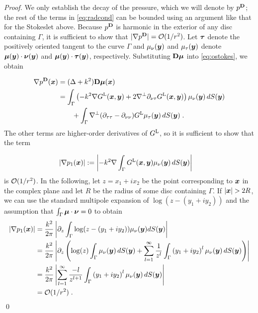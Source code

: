 \begin{proof}
We only establish the
decay of the pressure, which we will denote by $p^{\bf D}$;
the rest of the terms in \eqref{eq:radcond} can be bounded
using an argument like that for the Stokeslet above.
Because $p^{\bf D}$ is harmonic in the exterior of any disc
containing $\Gamma$, it is sufficient to show that
$|\nabla p^{\bf D}| = \mathcal{O} (1/r^2)$. Let ${\boldsymbol \tau}$ denote the
positively oriented tangent to the curve $\Gamma$ and
$\mu_\nu({\boldsymbol y})$ and $\mu_\tau({\boldsymbol y})$ denote ${\boldsymbol \mu}({\boldsymbol y}) \cdot {\boldsymbol \nu}({\boldsymbol y})$ and
${\boldsymbol \mu}({\boldsymbol y}) \cdot {\boldsymbol \tau}({\boldsymbol y})$, respectively. Substituting
${\bf D} {\boldsymbol \mu}$ into \eqref{eq:ostokes}, we obtain

\begin{align*}
\nabla p^{\bf D}({\boldsymbol x}) &= (\Delta + k^2) {\bf D} {\boldsymbol \mu}({\boldsymbol x}) \\
&= \int_\Gamma \left (-k^2 \nabla G^{\textrm{L}} ({\boldsymbol x},{\boldsymbol y}) +
2 \nabla^\perp \partial_{\nu\tau} G^{\textrm{L}} ({\boldsymbol x},{\boldsymbol y}) \right ) \mu_\nu({\boldsymbol y})
\, dS({\boldsymbol y}) \\
& \qquad + \int_\Gamma \nabla^\perp (\partial_{\tau\tau}-\partial_{\nu\nu})G^{\textrm{L}} \mu_\tau({\boldsymbol y})
\, dS({\boldsymbol y}) \; .
\end{align*}
The other terms are higher-order derivatives
of $G^{\textrm{L}}$, so it is sufficient to show that the term

\begin{align*}
|\nabla p_1({\boldsymbol x})| &:= \left |-k^2 \nabla \int_\Gamma G^{\textrm{L}}({\boldsymbol x},{\boldsymbol y})
\mu_\nu({\boldsymbol y}) \, dS({\boldsymbol y}) \right |
\end{align*}
is $\mathcal{O} (1/r^2)$. In the following, let $z = x_1 + i x_2$ be the
point corresponding to ${\boldsymbol x}$ in the complex plane and let $R$
be the radius of some disc containing $\Gamma$. If $|{\boldsymbol x}| > 2R$,
we can use the standard multipole expansion of $\log(z-(y_1+iy_2))$
and the assumption that $\int_\Gamma {\boldsymbol \mu} \cdot {\boldsymbol \nu} = 0$
to obtain
\begin{align*}
|\nabla p_1({\boldsymbol x})| &= \frac{k^2}{2\pi} \left |  \partial_z \int_\Gamma \log(z-(y_1+iy_2))
\mu_\nu({\boldsymbol y}) dS({\boldsymbol y}) \right | \\
&= \frac{k^2}{2\pi} \left |  \partial_z  \left ( \log(z) \int_\Gamma \mu_\nu({\boldsymbol y}) \, dS({\boldsymbol y})
+ \sum_{l=1}^\infty \frac{1}{z^l} \int_\Gamma \left( y_1+iy_2 \right)^l \mu_\nu({\boldsymbol y}) \, dS({\boldsymbol y})
\right ) \right | \\
&= \frac{k^2}{2\pi} \left | \sum_{l=1}^\infty \frac{-l}{z^{l+1}}
\int_\Gamma \left( y_1+iy_2 \right)^l \mu_\nu({\boldsymbol y}) \, dS({\boldsymbol y}) \right | \\
&= \mathcal{O} (1/r^2) \; .
\end{align*}
\qed
\end{proof}

